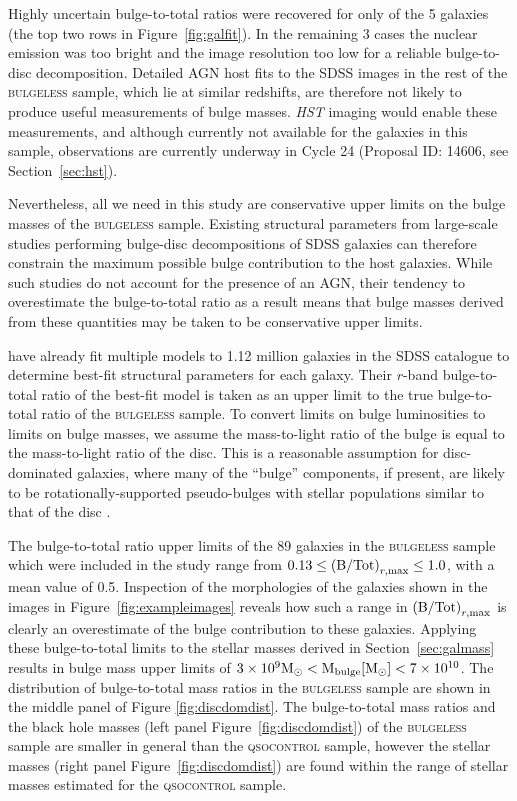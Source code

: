 {Highly uncertain bulge-to-total ratios were recovered for only {} of the 5 galaxies (the top two rows in Figure~\ref{fig:galfit}). In the remaining 3 cases the nuclear emission was too bright and the image resolution too low for a reliable bulge-to-disc decomposition.  Detailed AGN host fits to the SDSS images in the rest of the \textsc{bulgeless} sample, which lie at similar redshifts, are therefore not likely to produce useful measurements of bulge masses. \emph{HST} imaging would enable these measurements, and although currently not available for the galaxies in this sample, observations are currently underway in Cycle 24 (Proposal ID: 14606, see Section~\ref{sec:hst}). 

Nevertheless, all we need in this study are conservative upper limits on the bulge masses of the \textsc{bulgeless} sample. Existing structural parameters from large-scale studies performing bulge-disc decompositions of SDSS galaxies can therefore constrain the maximum possible bulge contribution to the host galaxies. While such studies do not account for the presence of an AGN, their tendency to overestimate the bulge-to-total ratio as a result means that bulge masses derived from these quantities may be taken to be conservative upper limits.

\citet{simard11} have already fit multiple models to 1.12 million galaxies in the SDSS catalogue to determine best-fit structural parameters for each galaxy. Their $r$-band bulge-to-total ratio {\notebsm of the best-fit model} is taken as an upper limit to the true bulge-to-total ratio of the \textsc{bulgeless} sample. To convert limits on bulge luminosities to limits on bulge masses, we assume the mass-to-light ratio of the bulge is equal to the mass-to-light ratio of the disc. This is a reasonable assumption for disc-dominated galaxies, where many of the ``bulge'' components, if present, are likely to be rotationally-supported pseudo-bulges \citep{kormendy04} with stellar populations similar to that of the disc {\notebsm \citep{graham01a}}.

The bulge-to-total ratio upper limits of the 89 galaxies in the \textsc{bulgeless} sample which were included in the \citet{simard11} study range from {\notebsm $0.13 \leq \left({\rm B/Tot}\right)_{r, \rm max} \leq 1.0$, with a mean value of 0.5}. Inspection of the morphologies of the galaxies shown in the images in Figure~\ref{fig:exampleimages} reveals how such a range in $\left({\rm B/Tot}\right)_{r, \rm max}$ is clearly an overestimate of the bulge contribution to these galaxies. Applying these bulge-to-total limits to the stellar masses derived in Section~\ref{sec:galmass} results in bulge mass upper limits of {\notebsm $3 \times 10^9 \rm{M}_{\odot} < \rm M_{\rm{bulge}}[\rm{M}_{\odot}] < 7 \times 10^{10} $}. The distribution of bulge-to-total mass ratios in the \textsc{bulgeless} sample are shown in the middle panel of Figure \ref{fig:discdomdist}. The bulge-to-total mass ratios and the black hole masses (left panel Figure~\ref{fig:discdomdist}) of the \textsc{bulgeless} sample are smaller in general than the \textsc{qsocontrol} sample, however the stellar masses (right panel Figure~\ref{fig:discdomdist}) are found within the range of stellar masses estimated for the \textsc{qsocontrol} sample. 

}
